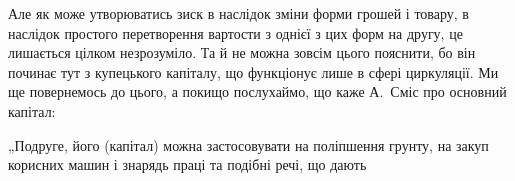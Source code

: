 Але як може утворюватись зиск в наслідок зміни форми грошей і
товару, в наслідок простого перетворення вартости з однієї з цих форм
на другу, це лишається цілком незрозуміло. Та й не можна зовсім цього
пояснити, бо він починає тут з купецького капіталу, що функціонує
лише в сфері циркуляції. Ми ще повернемось до цього, а покищо послухаймо,
що каже А.~Сміс про основний капітал:

„Подруге, його (капітал) можна застосовувати на поліпшення грунту,
на закуп корисних машин і знарядь праці та подібні речі, що дають
\parbreak{}  %
